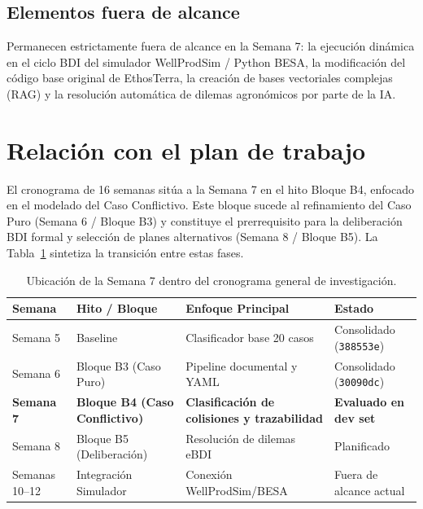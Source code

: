 \documentclass[11pt,a4paper]{article}
\begin{document}
\subsection{Elementos fuera de alcance}
Permanecen estrictamente fuera de alcance en la Semana 7: la ejecución dinámica en el ciclo BDI del simulador WellProdSim / Python BESA, la modificación del código base original de EthosTerra, la creación de bases vectoriales complejas (RAG) y la resolución automática de dilemas agronómicos por parte de la IA.

\section{Relación con el plan de trabajo}
El cronograma de 16 semanas sitúa a la Semana 7 en el hito Bloque B4, enfocado en el modelado del Caso Conflictivo. Este bloque sucede al refinamiento del Caso Puro (Semana 6 / Bloque B3) y constituye el prerrequisito para la deliberación BDI formal y selección de planes alternativos (Semana 8 / Bloque B5). La Tabla~\ref{tab:plan_trabajo} sintetiza la transición entre estas fases.

\begin{table}[H]
\centering
\small
\caption{Ubicación de la Semana 7 dentro del cronograma general de investigación.}
\label{tab:plan_trabajo}
\begin{tabularx}{\textwidth}{lp{4.2cm}p{4.2cm}X}
\toprule
\textbf{Semana} & \textbf{Hito / Bloque} & \textbf{Enfoque Principal} & \textbf{Estado} \\
\midrule
Semana 5 & Baseline & Clasificador base 20 casos & Consolidado (\texttt{388553e}) \\
Semana 6 & Bloque B3 (Caso Puro) & Pipeline documental y YAML & Consolidado (\texttt{30090dc}) \\
\textbf{Semana 7} & \textbf{Bloque B4 (Caso Conflictivo)} & \textbf{Clasificación de colisiones y trazabilidad} & \textbf{Evaluado en dev set} \\
Semana 8 & Bloque B5 (Deliberación) & Resolución de dilemas eBDI & Planificado \\
Semanas 10--12 & Integración Simulador & Conexión WellProdSim/BESA & Fuera de alcance actual \\
\bottomrule
\end{tabularx}
\end{table}
\end{document}
